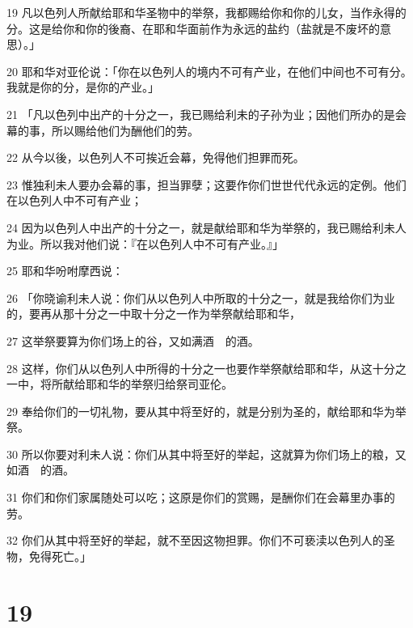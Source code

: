 \par 19 凡以色列人所献给耶和华圣物中的举祭，我都赐给你和你的儿女，当作永得的分。这是给你和你的後裔、在耶和华面前作为永远的盐约（盐就是不废坏的意思）。」
\par 20 耶和华对亚伦说：「你在以色列人的境内不可有产业，在他们中间也不可有分。我就是你的分，是你的产业。」
\par 21 「凡以色列中出产的十分之一，我已赐给利未的子孙为业；因他们所办的是会幕的事，所以赐给他们为酬他们的劳。
\par 22 从今以後，以色列人不可挨近会幕，免得他们担罪而死。
\par 23 惟独利未人要办会幕的事，担当罪孽；这要作你们世世代代永远的定例。他们在以色列人中不可有产业；
\par 24 因为以色列人中出产的十分之一，就是献给耶和华为举祭的，我已赐给利未人为业。所以我对他们说：『在以色列人中不可有产业。』」
\par 25 耶和华吩咐摩西说：
\par 26 「你晓谕利未人说：你们从以色列人中所取的十分之一，就是我给你们为业的，要再从那十分之一中取十分之一作为举祭献给耶和华，
\par 27 这举祭要算为你们场上的谷，又如满酒　的酒。
\par 28 这样，你们从以色列人中所得的十分之一也要作举祭献给耶和华，从这十分之一中，将所献给耶和华的举祭归给祭司亚伦。
\par 29 奉给你们的一切礼物，要从其中将至好的，就是分别为圣的，献给耶和华为举祭。
\par 30 所以你要对利未人说：你们从其中将至好的举起，这就算为你们场上的粮，又如酒　的酒。
\par 31 你们和你们家属随处可以吃；这原是你们的赏赐，是酬你们在会幕里办事的劳。
\par 32 你们从其中将至好的举起，就不至因这物担罪。你们不可亵渎以色列人的圣物，免得死亡。」

\chapter{19}

